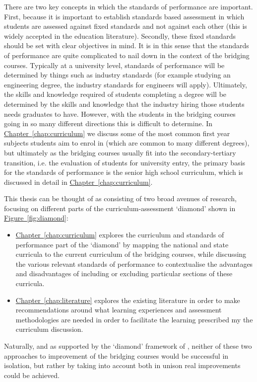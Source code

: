 \documentclass[twoside,12pt,a4paper]{report}
\newcommand{\refchap}[1]{\hyperref[chap:#1]{Chapter~\ref{chap:#1}}}
\newcommand{\reffig}[1]{\hyperref[fig:#1]{Figure~\ref{fig:#1}}}
\begin{document}
There are two key concepts in which the standards of performance are important. First, because it is important to establish standards based assessment in which students are assessed against fixed standards and not against each other (this is widely accepted in the education literature). Secondly, these fixed standards should be set with clear objectives in mind. It is in this sense that the standards of performance are quite complicated to nail down in the context of the bridging courses. Typically at a university level, standards of performance will be determined by things such as industry standards (for example studying an engineering degree, the industry standards for engineers will apply). Ultimately, the skills and knowledge required of students completing a degree will be determined by the skills and knowledge that the industry hiring those students needs graduates to have. However, with the students in the bridging courses going in so many different directions this is difficult to determine. In \refchap{curriculum} we discuss some of the most common first year subjects students aim to enrol in (which are common to many different degrees), but ultimately as the bridging courses usually fit into the secondary-tertiary transition, i.e. the evaluation of students for university entry, the primary basis for the standards of performance is the senior high school curriculum, which is discussed in detail in \refchap{curriculum}.

This thesis can be thought of as consisting of two broad avenues of research, focusing on different parts of the curriculum-assessment `diamond' shown in \reffig{diamond}:
\begin{itemize}
	\item \refchap{curriculum} explores the curriculum and standards of performance part of the `diamond' by mapping the national and state curricula to the current curriculum of the bridging courses, while discussing the various relevant standards of performance to contextualise the advantages and disadvantages of including or excluding particular sections of these curricula.
	\item \refchap{literature} explores the existing literature in order to make recommendations around what learning experiences and assessment methodologies are needed in order to facilitate the learning prescribed my the curriculum discussion. 
\end{itemize}
Naturally, and as supported by the `diamond' framework of , neither of these two approaches to improvement of the bridging courses would be successful in isolation, but rather by taking into account both in unison real improvements could be achieved.
\end{document}
